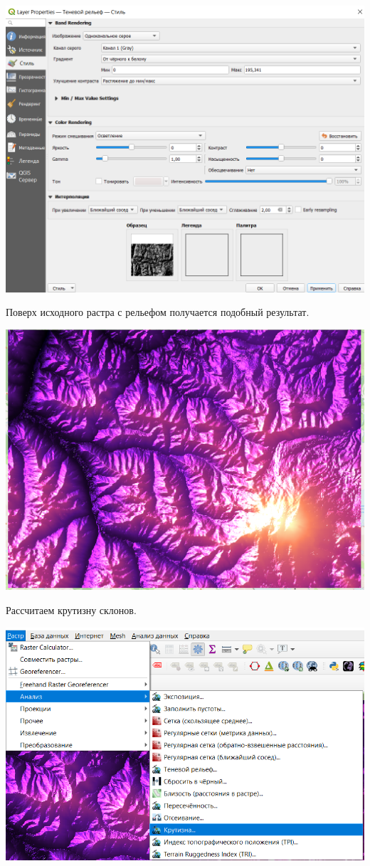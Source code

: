 \documentclass[
]{book}
\begin{document}
\includegraphics{figures/71.PNG}

Поверх исходного растра с рельефом получается подобный результат.

\includegraphics{figures/72.PNG}

Рассчитаем крутизну склонов.

\includegraphics{figures/73.png}
\end{document}
